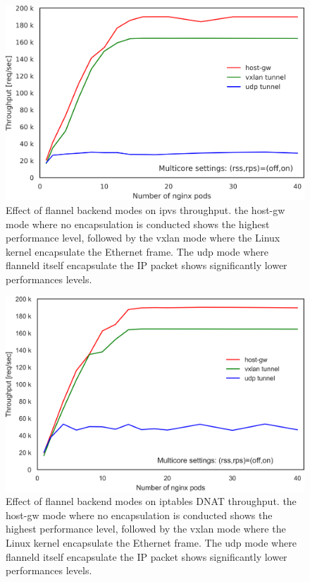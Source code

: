 \begin{figure}[h]
  \centering
  \includegraphics[width=0.8\columnwidth]{Figs/ipvs_flannel_mode}

  \par\bigskip
  \centering
  \begin{minipage}{0.8\columnwidth}
    \caption[Effect of flannel backend modes on ipvs throughput]{
      Effect of flannel backend modes on ipvs throughput.
      the host-gw mode where no encapsulation is conducted shows the highest performance level,
      followed by the vxlan mode where the Linux kernel encapsulate the Ethernet frame.
      The udp mode where flanneld itself encapsulate the IP packet shows significantly lower performances levels.
    }
    \label{fig:ipvs_flannel_mode}
  \end{minipage}
\end{figure}

\begin{figure}[h]
    \centering
    \includegraphics[width=0.8\columnwidth]{Figs/iptables_flannel_mode}

  \par\bigskip
  \centering
  \begin{minipage}{0.8\columnwidth}
    \caption[Effect of flannel backend modes on iptables DNAT throughput]{
      Effect of flannel backend modes on  iptables DNAT throughput.
      the host-gw mode where no encapsulation is conducted shows the highest performance level,
      followed by the vxlan mode where the Linux kernel encapsulate the Ethernet frame.
      The udp mode where flanneld itself encapsulate the IP packet shows significantly lower performances levels.
    }
    \label{fig:iptables_flannel_mode}
  \end{minipage}
\end{figure}

